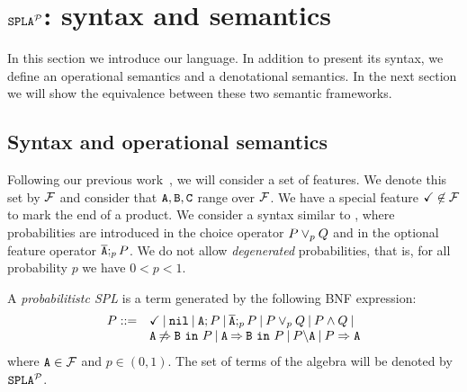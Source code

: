 \section{$\fodaPAp$: syntax and semantics}
\label{sec:stat:sintaxMain}
In this section we introduce our language. In addition to present its syntax, we define an operational semantics and a denotational semantics. In the next section we will show the equivalence between these two semantic frameworks.


\subsection{Syntax and operational semantics}
\label{sec:stat:sintax}
Following our previous work~\cite{acl13,cln16}, we will consider a
set of features. We denote this set by $\calF$ and consider that $\feature{A}, \feature{B},
\feature{C}$ range over $\calF$. We have a special feature
$\checkmark\not\in\calF$ to mark the end  of a product. We consider a syntax similar to
\fodaPA, where probabilities are introduced in the choice operator $P \choice_{p} Q $ and in
the optional feature operator $\ofeature{A};_{p} P$. We do not allow
\emph{degenerated} probabilities, that is, for all probability $p$ we have $0< p<1$.

\bdfn
\label{sec:stat:sintax:dfn}
A \emph{probabilitistc SPL} is a term generated by the following
BNF expression:
$$
\begin{array}{ll}
P::=& \checkmark \barra \nil \barra \feature{A};P \barra
\ofeature{A};_{p} P \barra P \choice_{p} Q \barra P \paral Q \barra
\\
& \exclude{A}{B}{P}\barra  \require{A}{B}{P}\barra  \forbid{A}{P}\barra  \mandatory{A}{P}\\
\end{array}
$$
\noindent
where $\feature{A} \in \calF$ and $p\in(0,1)$. The set of terms of the
algebra will be denoted by  $\fodaPAp$.
\edfn


